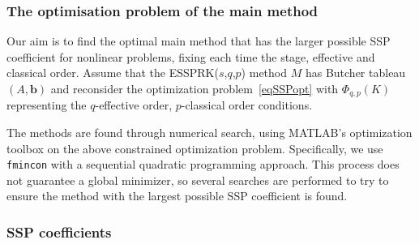 

\subsubsection{The optimisation problem of the main method}\label{subsection3.1.1}

\qquad Our aim is to find the optimal main method that has the larger possible SSP coefficient for nonlinear problems, fixing each time the stage, effective and classical order. 
Assume that the ESSPRK(\( s \),\( q \),\( p \)) method \( M \) has Butcher tableau  \( (A, \bm{b}) \)
and reconsider the optimization problem~\eqref{eqSSPopt}
with \( \Phi_{q,p}(K) \) representing  the \( q \)-effective order, \( p \)-classical order conditions.

The methods are found through numerical search, using
\textsc{MATLAB}'s optimization toolbox on the above constrained
optimization problem.  Specifically, we use \verb"fmincon" with a
sequential quadratic programming approach.
This process does not guarantee a global minimizer, so several
searches are performed to try to ensure the method with the largest possible SSP coefficient is found.


\subsubsection{SSP coefficients}\label{subsection3.1.2}


